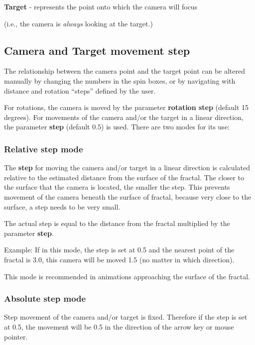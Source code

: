 \textbf{Target} - represents the point onto which the camera will focus

(i.e., the camera is \emph{always} looking at the target.)

\subsection{Camera and Target movement
step}\label{camera-and-target-movement-step}

The relationship between the camera point and the target point can be
altered manually by changing the numbers in the spin boxes, or by
navigating with distance and rotation ``steps'' defined by the user.

For rotations, the camera is moved by the parameter \textbf{rotation
step} (default 15 degrees). For movements of the camera and/or the
target in a linear direction, the parameter \textbf{step} (default 0.5)
is used. There are two modes for its use:

\subsubsection{Relative step mode}\label{relative-step-mode}

The \textbf{step} for moving the camera and/or target in a linear
direction is calculated relative to the estimated distance from the
surface of the fractal. The closer to the surface that the camera is
located, the smaller the step. This prevents movement of the camera
beneath the surface of fractal, because very close to the surface, a
step needs to be very small.

The actual step is equal to the distance from the fractal multiplied by
the parameter \textbf{step}.

Example: If in this mode, the step is set at 0.5 and the nearest point
of the fractal is 3.0, this camera will be moved 1.5 (no matter in which
direction).

This mode is recommended in animations approaching the surface of the
fractal.

\subsubsection{Absolute step mode}\label{absolute-step-mode}

Step movement of the camera and/or target is fixed. Therefore if the
step is set at 0.5, the movement will be 0.5 in the direction of the
arrow key or mouse pointer.

